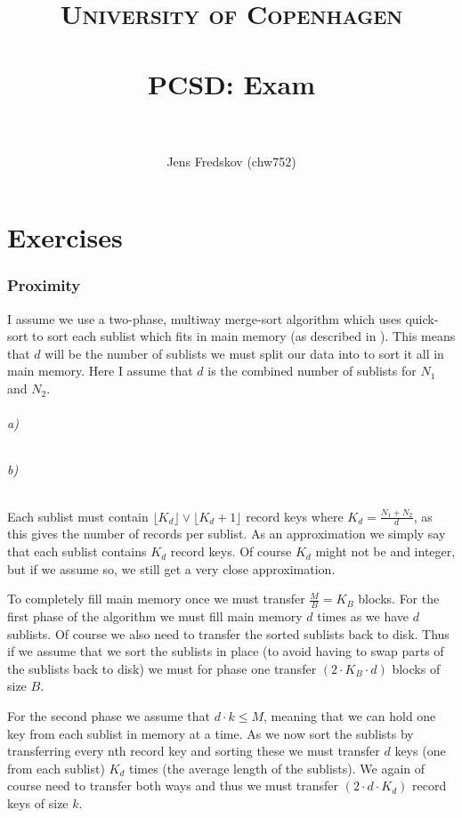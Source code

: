 \documentclass[a4paper, 11pt]{article}
\title{ 
\normalfont \normalsize 
\textsc{University of Copenhagen} \\ [25pt]
\horrule{0.5pt} \\[0.4cm]
\huge PCSD: Exam \\
\horrule{2pt} \\[0.5cm]
}
\author{Jens Fredskov (chw752)}
\begin{document}
\maketitle

\newpage
\part{Exercises} %
\label{prt:exercises_}

\section{Proximity} %
\label{sec:proximity}

I assume we use a two-phase, multiway merge-sort algorithm which uses quick-sort to sort each sublist which fits in main memory (as described in \cite{chap10}). This means that $d$ will be the number of sublists we must split our data into to sort it all in main memory. Here I assume that $d$ is the combined number of sublists for $N_1$ and $N_2$.

\paragraph{a)} %


\paragraph{b)} %

Each sublist must contain $\lfloor K_d \rfloor \vee \lfloor K_d + 1 \rfloor$ record keys where $K_d = \frac{N_1 + N_2}{d}$, as this gives the number of records per sublist. As an approximation we simply say that each sublist contains $K_d$ record keys. Of course $K_d$ might not be and integer, but if we assume so, we still get a very close approximation.

To completely fill main memory once we must transfer $\frac{M}{B} = K_B$ blocks. For the first phase of the algorithm we must fill main memory $d$ times as we have $d$ sublists. Of course we also need to transfer the sorted sublists back to disk. Thus if we assume that we sort the sublists in place (to avoid having to swap parts of the sublists back to disk) we must for phase one transfer $(2 \cdot K_B \cdot d)$ blocks of size $B$.

For the second phase we assume that $d \cdot k \le M$, meaning that we can hold one key from each sublist in memory at a time. As we now sort the sublists by transferring every nth record key and sorting these we must transfer $d$ keys (one from each sublist) $K_d$ times (the average length of the sublists). We again of course need to transfer both ways and thus we must transfer $(2 \cdot d \cdot K_d)$ record keys of size $k$.
\end{document}
